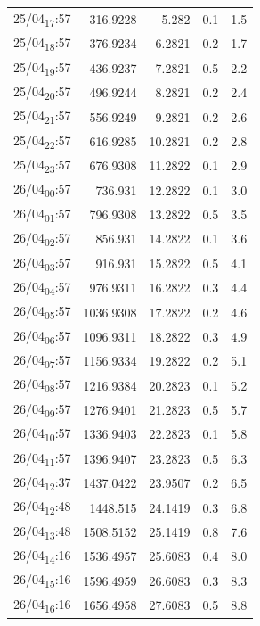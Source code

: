 \documentclass[11pt]{article}
\begin{document}
\begin{table}[htbp]
\begin{tabular}{lrrrr}
25/04\textsubscript{17}:57 & 316.9228 & 5.282 & 0.1 & 1.5\\[0pt]
25/04\textsubscript{18}:57 & 376.9234 & 6.2821 & 0.2 & 1.7\\[0pt]
25/04\textsubscript{19}:57 & 436.9237 & 7.2821 & 0.5 & 2.2\\[0pt]
25/04\textsubscript{20}:57 & 496.9244 & 8.2821 & 0.2 & 2.4\\[0pt]
25/04\textsubscript{21}:57 & 556.9249 & 9.2821 & 0.2 & 2.6\\[0pt]
25/04\textsubscript{22}:57 & 616.9285 & 10.2821 & 0.2 & 2.8\\[0pt]
25/04\textsubscript{23}:57 & 676.9308 & 11.2822 & 0.1 & 2.9\\[0pt]
26/04\textsubscript{00}:57 & 736.931 & 12.2822 & 0.1 & 3.0\\[0pt]
26/04\textsubscript{01}:57 & 796.9308 & 13.2822 & 0.5 & 3.5\\[0pt]
26/04\textsubscript{02}:57 & 856.931 & 14.2822 & 0.1 & 3.6\\[0pt]
26/04\textsubscript{03}:57 & 916.931 & 15.2822 & 0.5 & 4.1\\[0pt]
26/04\textsubscript{04}:57 & 976.9311 & 16.2822 & 0.3 & 4.4\\[0pt]
26/04\textsubscript{05}:57 & 1036.9308 & 17.2822 & 0.2 & 4.6\\[0pt]
26/04\textsubscript{06}:57 & 1096.9311 & 18.2822 & 0.3 & 4.9\\[0pt]
26/04\textsubscript{07}:57 & 1156.9334 & 19.2822 & 0.2 & 5.1\\[0pt]
26/04\textsubscript{08}:57 & 1216.9384 & 20.2823 & 0.1 & 5.2\\[0pt]
26/04\textsubscript{09}:57 & 1276.9401 & 21.2823 & 0.5 & 5.7\\[0pt]
26/04\textsubscript{10}:57 & 1336.9403 & 22.2823 & 0.1 & 5.8\\[0pt]
26/04\textsubscript{11}:57 & 1396.9407 & 23.2823 & 0.5 & 6.3\\[0pt]
26/04\textsubscript{12}:37 & 1437.0422 & 23.9507 & 0.2 & 6.5\\[0pt]
26/04\textsubscript{12}:48 & 1448.515 & 24.1419 & 0.3 & 6.8\\[0pt]
26/04\textsubscript{13}:48 & 1508.5152 & 25.1419 & 0.8 & 7.6\\[0pt]
26/04\textsubscript{14}:16 & 1536.4957 & 25.6083 & 0.4 & 8.0\\[0pt]
26/04\textsubscript{15}:16 & 1596.4959 & 26.6083 & 0.3 & 8.3\\[0pt]
26/04\textsubscript{16}:16 & 1656.4958 & 27.6083 & 0.5 & 8.8\\[0pt]

\end{tabular}
\end{table}
\end{document}
